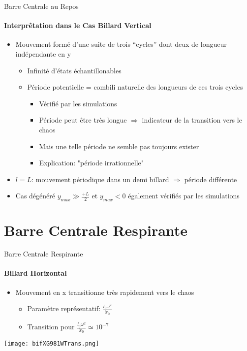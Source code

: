\documentclass{beamer}
\begin{document}
  \begin{frame}{Barre Centrale au Repos}
  \framesubtitle{Interprêtation dans le Cas Billard Vertical}
  \begin{itemize}
    \item Mouvement formé d'une suite de trois ``cycles'' dont deux de longueur indépendante en y
    \begin{itemize}
      \item Infinité d'états échantillonables
      \pause \item Période potentielle = combili naturelle des longueurs de ces trois cycles
      \begin{itemize}
        \item Vérifié par les simulations
        \item Période peut être très longue \(\Rightarrow\) indicateur de la transition vers le chaos
        \item Mais une telle période ne semble pas toujours exister
        \item Explication: "période irrationnelle"
      \end{itemize}
    \end{itemize}
    \pause \item \(l=L\): mouvement périodique dans un demi billard \(\Rightarrow\) période différente 
    \item Cas dégénéré \(y_{max} \gg \frac{+L}{2}\) et \( y_{max}<0 \) également vérifiés par les simulations
  \end{itemize}
  \end{frame}

  \section{Barre Centrale Respirante}
  
  \begin{frame}{Barre Centrale Respirante}
  \framesubtitle{Billard Horizontal}
  \begin{itemize}
    \item Mouvement en x transitionne très rapidement vers le chaos
    \begin{itemize}
      \item Paramètre représentatif: \(\frac{l_0 \omega ^ 2}{\dot{x}_0}\)
      \pause \item Transition pour \(\frac{l_0 \omega ^ 2}{\dot{x}_0} \simeq 10^{-7} \)
    \end{itemize}
  \end{itemize}
  \texttt{[image: bifXG981WTrans.png]}
  \end{frame}
  
\end{document}
